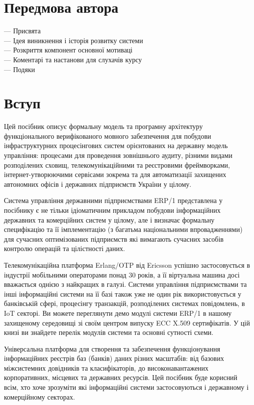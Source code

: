 \chapter*{Передмова автора}

— Присвята \\
— Ідея виникнення і історія розвитку системи \\
— Розкриття компонент основної мотиваці \\
— Коментарі та настанови для слухачів курсу \\
— Подяки \\

\chapter{Вступ}

Цей посібник описує формальну модель та програмну архітектуру
функціонального верифікованого мовного забезпечення
для побудови інфраструктурних процесінгових систем
орієнтованих на державну модель управління:
процесами для проведення зовнішнього аудиту,
різними видами розподілених сховищ,
телекомунікаційними та реєстровими фреймворками,
інтернет-утворюючими сервісами зокрема та для
автоматизації захищених автономних офісів і
державних підприємств України у цілому.

Система управління державними підприємствами ERP/1 представлена у
посібнику є не тільки ідіоматичним прикладом побудови інформаційних державних та комерційних систем у цілому,
але і визначає формальну специфікацію та її імплементацію (з багатьма національними впровадженнями)
для сучасних оптимізованих підприємств які вимагають сучасних засобів контролю операцій та цілістності даних.

Телекомунікаційна платформа Erlang/OTP від Ericsson успішно застосовується
в індустрії мобільними операторами понад 30 років, а її віртуальна машина
досі вважається однією з найкращих в галузі. Системи управління підприємствами та інші інформаційні системи
на її базі також уже не один рік використовується у банківській сфері, процесінгу транзакцій,
розподілених системах повідомлень, в IoT секторі. Ви можете переглянути демо
модулі системи ERP/1 в нашому захищеному середовищі зі своїм центром
випуску ECC X.509 сертифікатів. У цій книзі ви знайдете перелік модулів
системи та основні сутності схеми.

Універсальна платформа для створення та забезпечення функціонування
інформаційних реєстрів баз (банків) даних різних масштабів: від базових
міжсистемних довідників та класифікаторів, до високонавантажених корпоративних,
місцевих та державних ресурсів. Цей посібник буде корисний всім,
хто хоче зрозуміти які інформаційні системи застосовуються і
державному і комерційному секторах.

